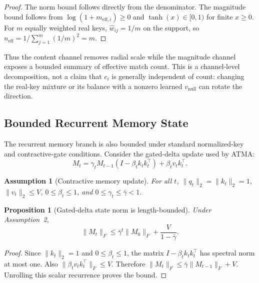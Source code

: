 \documentclass{article} %
\newtheorem{assumption}{Assumption}
\newtheorem{proposition}{Proposition}
\begin{document}
\begin{proof}
The norm bound follows directly from the denominator. The magnitude bound follows
from $\log(1+m_{\mathrm{eff},i})\ge0$ and $\tanh(x)\in[0,1)$ for finite $x\ge0$. For $m$
equally weighted real keys, $\hat{w}_{ij}=1/m$ on the support, so
$n_{\mathrm{eff}}=1/\sum_{j=1}^{m}(1/m)^2=m$.
\end{proof}

Thus the content channel removes radial scale while the magnitude channel exposes a bounded
summary of effective match count. This is a channel-level decomposition, not a claim that
$c_i$ is generally independent of count: changing the real-key mixture or its balance with a
nonzero learned $v_{\mathrm{null}}$ can rotate the direction.

\subsection{Bounded Recurrent Memory State}

The recurrent memory branch is also bounded under standard normalized-key and contractive-gate
conditions. Consider the gated-delta update used by ATMA:
\begin{equation}
    M_t = \gamma_t M_{t-1}(I-\beta_t k_tk_t^\top) + \beta_t v_tk_t^\top .
\end{equation}

\begin{assumption}[Contractive memory update]
For all $t$, $\lVert q_t\rVert_2=\lVert k_t\rVert_2=1$, $\lVert v_t\rVert_2\le V$, $0\le\beta_t\le1$, and
$0\le\gamma_t\le\bar{\gamma}<1$.
\end{assumption}

\begin{proposition}[Gated-delta state norm is length-bounded]
Under Assumption~2,
\begin{equation}
    \lVert M_t\rVert_F
    \le
    \bar{\gamma}^t\lVert M_0\rVert_F + \frac{V}{1-\bar{\gamma}} .
\end{equation}
\end{proposition}

\begin{proof}
Since $\lVert k_t\rVert_2=1$ and $0\le\beta_t\le1$, the matrix
$I-\beta_t k_tk_t^\top$ has spectral norm at most one. Also
$\lVert \beta_t v_tk_t^\top\rVert_F \le V$. Therefore
$\lVert M_t\rVert_F\le \bar{\gamma}\lVert M_{t-1}\rVert_F+V$. Unrolling this scalar
recurrence proves the bound.
\end{proof}
\end{document}
